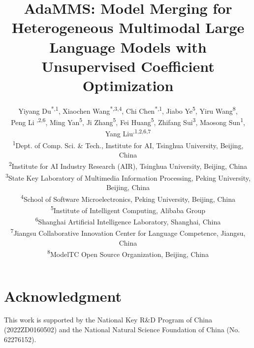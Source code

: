 \documentclass[10pt,twocolumn,letterpaper,dvipsnames,table]{article}
\title{AdaMMS: Model Merging  for Heterogeneous Multimodal Large Language Models with Unsupervised Coefficient Optimization }
\author{
Yiyang Du\textsuperscript{*,1}, 
Xiaochen Wang\textsuperscript{*,3,4}, 
Chi Chen\textsuperscript{*,1}, 
Jiabo Ye\textsuperscript{5},
Yiru Wang\textsuperscript{8}, \\ 
{
Peng Li \textsuperscript{\Letter,2,6}, 
Ming Yan\textsuperscript{5}, 
Ji Zhang\textsuperscript{5}, 
Fei Huang\textsuperscript{5}, 
Zhifang Sui\textsuperscript{3}, 
Maosong Sun\textsuperscript{1}, 
Yang Liu\textsuperscript{\Letter,1,2,6,7}} \\
  \textsuperscript{1}Dept. of Comp. Sci. \& Tech., Institute for AI, Tsinghua University, Beijing, China \\
  \textsuperscript{2}Institute for AI Industry Research (AIR), Tsinghua University, Beijing, China \\
  \textsuperscript{3}State Key Laboratory of Multimedia Information Processing, Peking University, Beijing, China\\
  \textsuperscript{4}School of Software Microelectronics, Peking University, Beijing, China\\
  \textsuperscript{5}Institute of Intelligent Computing, Alibaba Group\\
  \textsuperscript{6}Shanghai Artificial Intelligence Laboratory, Shanghai, China\\
  \textsuperscript{7}Jiangsu Collaborative Innovation Center for Language Competence, Jiangsu, China\\
  \textsuperscript{8}ModelTC Open Source Organization, Beijing, China
}
\begin{document}
\maketitle
    








\section*{Acknowledgment}
    
This work is supported by the National Key R\&D Program of China (2022ZD0160502) and the National Natural Science Foundation of China (No. 62276152).

{
    \small
    
    
}


\end{document}
